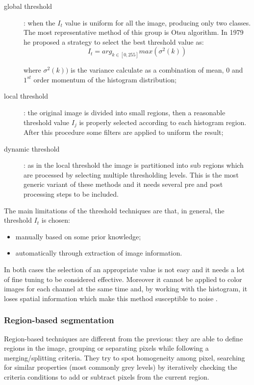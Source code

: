 \documentclass[../main.tex]{subfiles}
\begin{document}
\begin{description}
\item[global threshold] : when the $I_{t}$ value is uniform for all the image, producing only two classes. The most representative method of this group is Otsu \cite{otsu} algorithm. In 1979 he proposed a strategy to select the best threshold value as:
\begin{equation}
    I_{t} = arg_{k \in [0, 255]}max(\sigma^{2}(k))
\end{equation}

where $\sigma^{2}(k))$ is the variance calculate as a combination of mean, $0$ and  $1^{st}$ order momentum of the histogram distribution;
\item[local threshold] : the original image is divided into small regions, then a reasonable threshold value $I_{j}$ is properly selected according to each histogram region. After this procedure some filters are applied to uniform the result;
\item[dynamic threshold] : as in the local threshold the image is partitioned into sub regions which are processed by selecting multiple thresholding levels. This is the most generic variant of these methods and it needs several pre and post processing steps to be included. 
\end{description}

The main limitations of the threshold techniques are that, in general, the threshold $I_{t}$ is chosen:
\begin{itemize}
    \item manually based on some prior knowledge;
    \item automatically through extraction of image information.
\end{itemize}

In both cases the selection of an appropriate value is not easy and it needs a lot of fine tuning to be considered effective\cite{automated_segm_tech}. Moreover it cannot be applied to color images for each channel at the same time and, by working with the histogram, it loses spatial information which make this method susceptible to noise \cite{segmentation_review_1}.


\subsubsection{\large{Region-based segmentation}}

Region-based techniques are different from the previous: they are able to define regions in the image, grouping or separating pixels while following a merging/splitting criteria\cite{kaganami2009region-based}. They try to spot homogeneity among pixel, searching for similar properties (most commonly grey levels) by iteratively checking the criteria conditions to add or subtract pixels from the current region.
\end{document}
